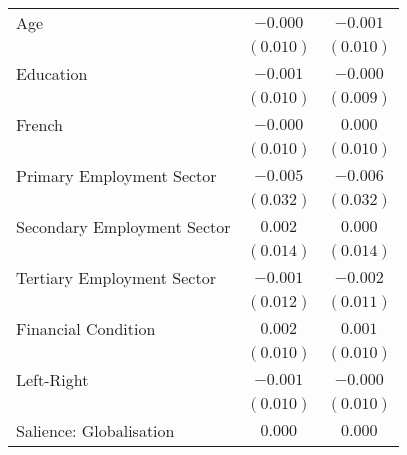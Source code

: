 \begin{center}
\begin{tiny}
\begin{longtable}{l@{} c@{} c@{}}
\quad Age                                                                  & $-0.000$        & $-0.001$       \\
                                                                           & $(0.010)$       & $(0.010)$      \\
\quad Education                                                            & $-0.001$        & $-0.000$       \\
                                                                           & $(0.010)$       & $(0.009)$      \\
\quad French                                                               & $-0.000$        & $0.000$        \\
                                                                           & $(0.010)$       & $(0.010)$      \\
\quad Primary Employment Sector                                            & $-0.005$        & $-0.006$       \\
                                                                           & $(0.032)$       & $(0.032)$      \\
\quad Secondary Employment Sector                                          & $0.002$         & $0.000$        \\
                                                                           & $(0.014)$       & $(0.014)$      \\
\quad Tertiary Employment Sector                                           & $-0.001$        & $-0.002$       \\
                                                                           & $(0.012)$       & $(0.011)$      \\
\quad Financial Condition                                                  & $0.002$         & $0.001$        \\
                                                                           & $(0.010)$       & $(0.010)$      \\
\quad Left-Right                                                           & $-0.001$        & $-0.000$       \\
                                                                           & $(0.010)$       & $(0.010)$      \\
\quad Salience: Globalisation                                              & $0.000$         & $0.000$        \\

\end{longtable}
\end{tiny}
\end{center}

